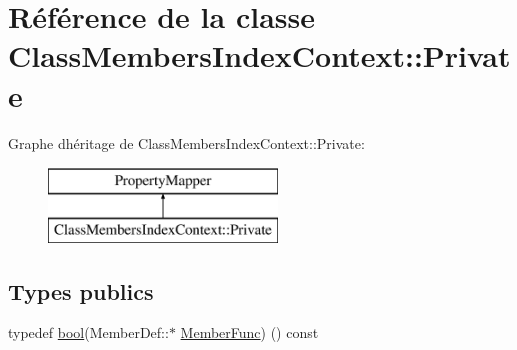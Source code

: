 \hypertarget{class_class_members_index_context_1_1_private}{}\section{Référence de la classe Class\+Members\+Index\+Context\+:\+:Private}
\label{class_class_members_index_context_1_1_private}
Graphe d\textquotesingle{}héritage de Class\+Members\+Index\+Context\+:\+:Private\+:\begin{figure}[H]
\begin{center}
\leavevmode
\includegraphics[height=2.000000cm]{class_class_members_index_context_1_1_private}
\end{center}
\end{figure}
\subsection*{Types publics}
\begin{DoxyCompactItemize}
\item 
typedef \hyperlink{qglobal_8h_a1062901a7428fdd9c7f180f5e01ea056}{bool}(Member\+Def\+::$\ast$ \hyperlink{class_class_members_index_context_1_1_private_a8732304406adf01d0845051997d13762}{Member\+Func}) () const 
\end{DoxyCompactItemize}
